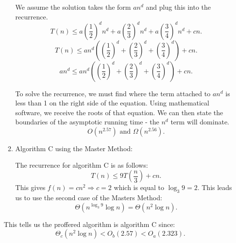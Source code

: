 \documentclass[letterpaper,11pt]{article}
\begin{document}
\begin{enumerate}
\begin{enumerate}
        We assume the solution takes the form $an^{d}$ and plug this into the
        recurrence.
        \[
            T\left( n \right) \le a\left( \frac{1}{2} \right) ^{d} n^{d}
            + a\left( \frac{2}{3} \right) ^{d}n^{d} 
            + a\left( \frac{3}{4} \right) ^{d}n^{d} + cn
        .\] 
        \[
            T\left( n \right) \le  an^{d}\left( \left( \frac{1}{2} \right) ^{d}
            + \left( \frac{2}{3} \right) ^{d} 
            + \left( \frac{3}{4} \right)^{d} \right) + cn
        .\] 
        \[
            an^{d} \le  an^{d}\left( \left( \frac{1}{2} \right) ^{d}
            + \left( \frac{2}{3} \right) ^{d} 
            + \left( \frac{3}{4} \right)^{d} \right) + cn
        .\] 

        To solve the recurrence, we must find where the term attached to $an^{d}$
        is less than 1 on the right side of the equation. 
        Using mathematical software, we receive the roots of
        that equation. We can then state the boundaries of the asymptotic 
        running time - the $n^{d}$ term will dominate. 
        \[
            O\left( n^{2.57} \right) \text{ and } \Omega \left( n^{2.56} \right) 
        .\] 

    \item Algorithm C using the Master Method:

        The recurrence for algorithm C is as follows:
        \[
            T\left( n \right) \le  9T\left( \frac{n}{3} \right) + cn
        .\] 
        This gives $f\left( n \right) = cn^{2} \Rightarrow c = 2$ which is 
        equal to $\log_{3}{9} = 2$. This leads us to use the second case of 
        the Masters Method:
        \[
            \Theta\left( n^{\log_{3}{9}} \log{n} \right) = \Theta \left( n^{2}\log{n} \right) 
        .\] 

\end{enumerate}

\color{teal}
This tells us the proffered algorithm is algorithm C since:
 \[
     \Theta_{c}\left( n^{2}\log{n} \right) < O_{b}\left( 2.57 \right) < O_{a}\left( 2.323 \right) 
.\] 

\end{enumerate}
\end{document}
